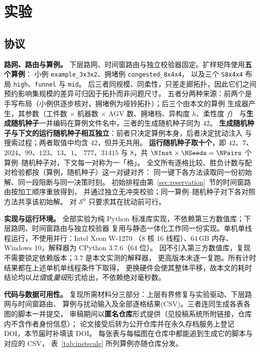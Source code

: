 \section{实验}
\label{sec:experiments}

\subsection{协议}
\label{sec:protocol}

\textbf{路网、路由与算例。}
下层路网、时间窗路由与独立校验器固定。扩样矩阵使用\textbf{五个算例}：
小例 \texttt{example\_3x3x2}、拥堵例 \texttt{congested\_8x4x4}，
以及三个 \texttt{S8x4x4} 布局 \texttt{high}、\texttt{funnel} 与 \texttt{mid}。
后三者同规模、同柔性，只差走廊拓扑，因此它们之间预约影响集规模的差异可归因于拓扑而非问题尺寸。
五者分两种来源：前两个是手写布局（小例供逐步核对，拥堵例为哑铃拓扑）；后三个由本文的算例
生成器产生，其参数（工件数 \(\times\) 机器数 \(\times\) AGV 数、拥堵档、异构度 \(h\)、柔性度 \(f\)）
与\textbf{生成随机种子}一并编码在算例文件名中，三者的生成随机种子同为 \(42\)。
\textbf{生成随机种子与下文的运行随机种子相互独立}：前者只决定算例本身，后者决定扰动注入
与搜索过程；两者取值中均含 \(42\)，但并无共用。
\textbf{运行随机种子取十个}，即 \(42\)、\(7\)、\(2024\)、\(99\)、\(123\)、\(13\)、\(1\)、
\(777\)、\(31415\) 与 \(8\)，共 \(\NInst\times\NSeeds=\NPairs\) 个算例--随机种子对，下文每一对称为一「格」。
全文所有逐格比较、胜负计数与配对检验都按（算例，随机种子）这一对键对齐：
同一键下各方法读取同一份初始解、同一段阻断与同一决策时刻。
初始排程由第~\ref{sec:reservation}~节的时间窗路由按加工顺序重放得到，
并通过独立无冲突校验；同一算例--随机种子对下各对照方法共享该初始解。
对 \(\mathcal{S}^0\) 只要求其在扰动前可行。

\textbf{实现与运行环境。}
全部实验为纯 Python 标准库实现，不依赖第三方数值库；下层路网、时间窗路由与独立校验器
复用与静态一体化工作同一份实现。单机单线程运行，不使用并行：Intel Xeon W-1270
（\(8\) 核 \(16\) 线程）、\(64\)\,GB 内存、Windows 10，解释器为 CPython \(3.7.6\)（\(64\) 位）。
因不引入第三方数值库，复现不需要锁定依赖版本；\(3.7\) 是本文实测的解释器，
更高版本未逐一复跑。所有计时结果都在上述单机单线程条件下取得，
更换硬件会使其整体平移，故本文的耗时结论均以\emph{比值}或\emph{量级}形式给出，不依赖绝对毫秒数。

\textbf{代码与数据可用性。}
复现所需材料分三部分：上层有界修复与实验驱动、下层路网与时间窗路由、
算例与扰动输入及全部逐格结果(CSV)。三者连同生成各表各图的脚本一并提交，
审稿期间以\textbf{匿名仓库}形式提供（见投稿系统所附链接，仓库内不含作者身份信息）；
论文接受后转为公开仓库并在永久存档服务上登记 DOI，本节届时补填该 DOI。
每张表与每幅图在仓库中都能追到生成它的脚本与对应的 CSV，
表~\ref{tab:instscale} 所列算例亦随仓库分发。

